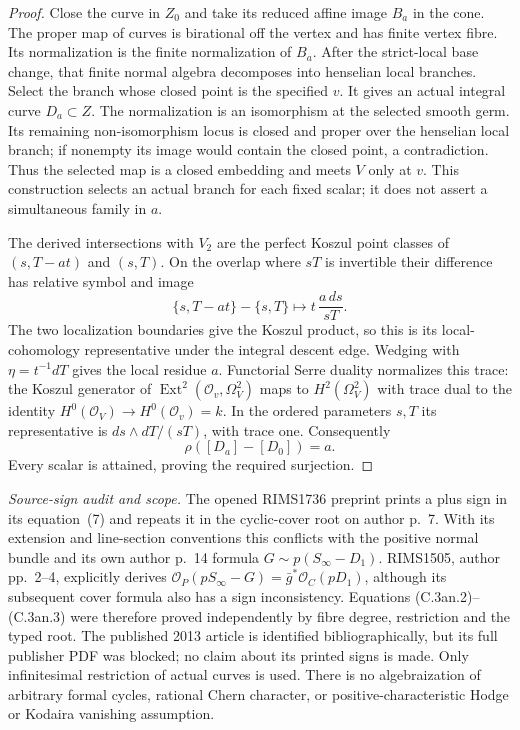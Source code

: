 \begin{proof}
Close the curve in $Z_0$ and take its reduced affine
image $B_a$ in the cone. The proper map of curves is
birational off the vertex and has finite vertex fibre.
Its normalization is the finite normalization of $B_a$.
After the strict-local base change, that finite normal
algebra decomposes into henselian local branches.
Select the branch whose closed point is the specified
$v$. It gives an actual integral curve $D_a\subset Z$.
The normalization is an isomorphism at the selected
smooth germ. Its remaining non-isomorphism locus is
closed and proper over the henselian local branch;
if nonempty its image would contain the closed point,
a contradiction. Thus the selected map is a closed
embedding and meets $V$ only at $v$. This construction
selects an actual branch for each fixed scalar; it
does not assert a simultaneous family in $a$.

The derived intersections with $V_2$ are the perfect
Koszul point classes of $(s,T-at)$ and $(s,T)$.
On the overlap where $sT$ is invertible their difference
has relative symbol and image
\[
 \{s,T-at\}-\{s,T\}\longmapsto
                            t\,\frac{a\,ds}{sT}.
                                                        \tag{C.3an.12}
\]
The two localization boundaries give the Koszul product,
so this is its local-cohomology representative under
the integral descent edge. Wedging with
$\eta=t^{-1}dT$ gives the local residue $a$.
Functorial Serre duality normalizes this trace: the
Koszul generator of
$\operatorname{Ext}^2(\mathcal O_v,\Omega^2_V)$ maps
to $H^2(\Omega^2_V)$ with trace dual to the identity
$H^0(\mathcal O_V)\to H^0(\mathcal O_v)=k$.
In the ordered parameters $s,T$ its representative is
$ds\wedge dT/(sT)$, with trace one. Consequently
\[
                         \rho([D_a]-[D_0])=a.
                                                        \tag{C.3an.13}
\]
Every scalar is attained, proving the required surjection.
\end{proof}

\emph{Source-sign audit and scope.}
The opened RIMS1736 preprint prints a plus sign in its
equation~(7) and repeats it in the cyclic-cover root on
author p.~7. With its extension and line-section conventions
this conflicts with the positive normal bundle and its own
author p.~14 formula $G\sim p(S_\infty-D_1)$.
RIMS1505, author pp.~2--4, explicitly derives
$\mathcal O_P(pS_\infty-G)=\bar g^*\mathcal O_C(pD_1)$,
although its subsequent cover formula also has a sign
inconsistency. Equations (C.3an.2)--(C.3an.3) were therefore
proved independently by fibre degree, restriction and the
typed root. The published 2013 article is identified
bibliographically, but its full publisher PDF was blocked;
no claim about its printed signs is made.
Only infinitesimal restriction of actual curves is used.
There is no algebraization of arbitrary formal cycles,
rational Chern character, or positive-characteristic
Hodge or Kodaira vanishing assumption.
